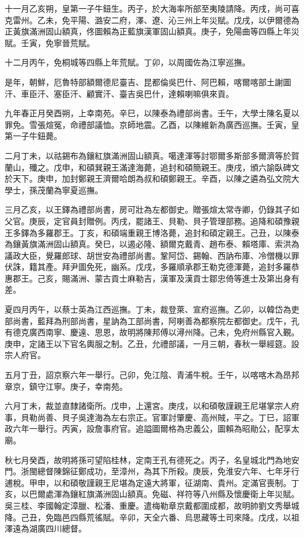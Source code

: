 \begin{pinyinscope}
十一月乙亥朔，皇第一子牛鈕生。丙子，於大海率所部至夷陵請降。丙戌，尚可喜克雷州。乙未，免平陽、潞安二府，澤、遼、沁三州上年災賦。戊戌，以伊爾德為正黃旗滿洲固山額真，佟圖賴為正藍旗漢軍固山額真。庚子，免陽曲等四縣上年災賦。壬寅，免寧晉荒賦。

十二月丙午，免桐城等四縣上年荒賦。丁卯，以周國佐為江寧巡撫。

是年，朝鮮，厄魯特部額爾德尼臺吉、昆都倫吳巴什、阿巴賴，喀爾喀部土謝圖汗、車臣汗、塞臣汗、顧實汗、臺吉吳巴什，達賴喇嘛俱來貢。

九年春正月癸酉朔，上幸南苑。辛巳，以陳泰為禮部尚書。壬午，大學士陳名夏以罪免。雪張煊冤，命禮部議恤。京師地震。乙酉，以陳維新為廣西巡撫。壬寅，皇第一子牛鈕薨。

二月丁未，以祜錫布為鑲紅旗滿洲固山額真。噶達渾等討鄂爾多斯部多爾濟等於賀蘭山，殲之。戊申，和碩巽親王滿達海薨，追封和碩簡親王。庚戌，頒六諭臥碑文於天下。庚申，加封鄭親王濟爾哈朗為叔和碩鄭親王。辛酉，以陳之遴為弘文院大學士，孫茂蘭為寧夏巡撫。

三月乙亥，以王鐸為禮部尚書，房可壯為左都御史。贈張煊太常寺卿，仍錄其子如父官。庚辰，定官員封贈例。丙戌，罷諸王、貝勒、貝子管理部務。追降和碩豫親王多鐸為多羅郡王。丁亥，和碩端重親王博洛薨，追封和碩定親王。己丑，以陳泰為鑲黃旗滿洲固山額真。癸巳，以遏必隆、額爾克戴青、趙布泰、賴塔庫、索洪為議政大臣，覺羅郎球、胡世安為禮部尚書。鞏阿岱、錫翰、西訥布庫、冷僧機以罪伏誅，籍其產。拜尹圖免死，幽系。戊戌，多羅順承郡王勒克德渾薨，追封多羅恭惠郡王。己亥，賜滿洲、蒙古貢士麻勒吉，漢軍及漢貢士鄒忠倚等進士及第出身有差。

夏四月丙午，以蔡士英為江西巡撫。丁未，裁登萊、宣府巡撫。乙卯，以韓岱為吏部尚書，藍拜為刑部尚書，星訥為工部尚書，阿喇善為都察院左都御史。戊午，孔有德克廣西南寧、慶遠、思恩，故明將陳邦傅以潯州降。己未，免府州縣官入覲。庚申，定諸王以下官名輿服之制。乙丑，允禮部議，一月三朝，春秋一舉經筵。設宗人府官。

五月丁丑，詔京察六年一舉行。己卯，免江陰、青浦牛稅。壬午，以喀喀木為昂邦章京，鎮守江寧。庚子，幸南苑。

六月丁未，裁並直隸諸衛所。戊申，上還宮。庚戌，以和碩敬謹親王尼堪掌宗人府事，貝勒尚善、貝子吳達海為左右宗正。官軍討肇慶、高州賊，平之。丁巳，詔軍政六年一舉行。丙寅，設詹事府官。追謚圖爾格為忠義公，圖賴為昭勛公，配享太廟。

秋七月癸酉，故明將孫可望陷桂林，定南王孔有德死之。丙子，名皇城北門為地安門。浙閩總督陳錦征鄭成功，至漳州，為其下所殺。庚辰，免淮安六年、七年牙行逋稅。甲申，以和碩敬謹親王尼堪為定遠大將軍，征湖南、貴州。定滿官喪制。丁亥，以巴爾處渾為鑲紅旗滿洲固山額真。免磁、祥符等八州縣及懷慶衛上年災賦。吳三桂、李國翰定漳臘、松潘、重慶。遣梅勒章京戴都圍成都，故明帥劉文秀舉城降。己丑，免臨邑四縣荒徭賦。辛卯，天全六番、烏思藏等土司來降。戊戌，以祖澤遠為湖廣四川總督。


\end{pinyinscope}
